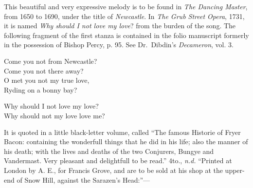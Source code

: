 

This beautiful and very expressive melody is to be found in \textit{The Dancing
Master}, from 1650 to 1690, under the title of \textit{Newcastle}. In \textit{The Grub Street
Opera}, 1731, it is named \textit{Why should I not love my love}? from the burden of the
song. The following fragment of the first stanza is contained in the folio manuscript
formerly in the possession of Bishop Percy, p. 95. See Dr.~Dibdin’s
\textit{Decameron}, vol. 3.
\settowidth{\versewidth}{Come you not from Newcastle?}
\begin{dcverse}\begin{altverse}
Come you not from Newcastle?\\
Come you not there away?\\
O met you not my true love,\\
Ryding on a bonny bay?
\end{altverse}

\begin{altverse}
Why should I not love my love?\\
Why should not my love love me?\\
{\quad *\quad *\quad *\quad *\quad *\quad *\quad }
\end{altverse}
\end{dcverse}
It is quoted in a little black-letter volume, called “The famous Historie of
Fryer Bacon: containing the wonderfull things that he did in his life; also the
manner of his death; with the lives and deaths of the two Conjurers, Bungye
and Vandermast. Very pleasant and delightfull to be read.” 4to., \textit{n.d.} “Printed
at London by A. E., for Francis Grove, and are to be sold at his shop at the
upper-end of Snow Hill, against the Sarazen’s Head:”—

